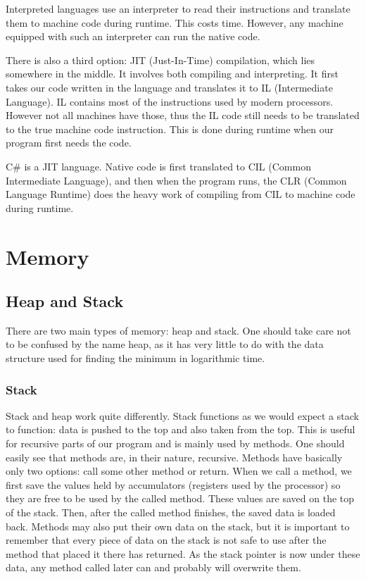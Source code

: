 Interpreted languages use an interpreter to read their instructions and translate them to machine code during runtime. This costs time. However, any machine equipped with such an interpreter can run the native code.

There is also a third option: JIT (Just-In-Time) compilation, which lies somewhere in the middle. It involves both compiling and interpreting. It first takes our code written in the language and translates it to IL (Intermediate Language). IL contains most of the instructions used by modern processors. However not all machines have those, thus the IL code still needs to be translated to the true machine code instruction.
This is done during runtime when our program first needs the code. 

C\# is a JIT language. Native code is first translated to CIL (Common Intermediate Language), and then when the program runs, the CLR (Common Language Runtime) does the heavy work of compiling from CIL to machine code during runtime.

\section{Memory}
\subsection{Heap and Stack}
There are two main types of memory: heap and stack. One should take care not to be confused by the name heap, as it has very little to do with the data structure used for finding the minimum in logarithmic time.

\subsubsection{Stack}
Stack and heap work quite differently. Stack functions as we would expect a stack to function: data is pushed to the top and also taken from the top. This is useful for recursive parts of our program and is mainly used by methods. One should easily see that methods are, in their nature, recursive. Methods have basically only two options: call some other method or return. When we call a method, we first save the values held by accumulators (registers used by the processor) so they are free to be used by the called method. These values are saved on the top of the stack. Then, after the called method finishes, the saved data is loaded back. Methods may also put their own data on the stack, but it is important to remember that every piece of data on the stack is not safe to use after the method that placed it there has returned. As the stack pointer is now under these data, any method called later can and probably will overwrite them.

